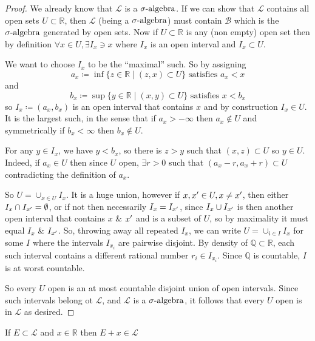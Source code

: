\begin{proof}
    We already know that $\mathcal{L}$ is a $\sigma\text{-algebra}$.
    If we can show that $\mathcal{L}$ contains all open sets $U \subset \mathbb{R}$, then $\mathcal{L}$ (being a $\sigma\text{-algebra}$) must contain $\mathcal{B}$ which is the $\sigma\text{-algebra}$ generated by open sets.
    Now if $U \subset \mathbb{R}$ is any (non empty) open set then by definition $\forall x \in U, \exists I_x \ni x $ where $I_x$ is an open interval and $I_x \subset U$.

    We want to choose $I_x$ to be the ``maximal'' such.
    So by assigning
    \[
        a_x \coloneqq \inf \{z \in \mathbb{R} \mid (z,x) \subset U \} \text{ satisfies } a_x < x
    \]
    and
    \[
        b_x \coloneqq \sup \{y \in \mathbb{R} \mid (x,y) \subset U \} \text{ satisfies } x < b_x
    \]
    so $I_x \coloneqq (a_x,b_x)$ is an open interval that contains $x$ and by construction $I_x \in U$.
    It is the largest such, in the sense that if $a_x > - \infty$ then $a_x \notin U$ and symmetrically if $b_x < \infty$ then $b_x \notin U$.

    For any $y \in I_x$, we have $y<b_x$, so there is $z > y$ such that $(x,z) \subset U$ so $y \in U$.
    Indeed, if $a_x \in U$ then since $U$ open, $\exists r > 0$ such that $(a_x - r, a_x +r) \subset U$ contradicting the definition of $a_x$.

    So $U = \cup_{x \in U} I_x$.
    It is a huge union, however if $x, x^{\prime} \in U, x \neq x^{\prime}$, then either $I_x \cap I_{x^{\prime}} = \emptyset$, or if not then necessarily $I_x = I_{x^{\prime}}$, since $I_x \cup I_{x^{\prime}}$ is then another open interval that contains $x$ \& $x^{\prime}$ and is a subset of $U$, so by maximality it must equal $I_x$ \& $I_{x^{\prime}}$.
    So, throwing away all repeated $I_x$, we can write $U = \cup_{i \in I} I_x$ for some $I$ where the intervals $I_{x_i}$ are pairwise disjoint.
    By density of $\mathbb{Q} \subset \mathbb{R}$, each such interval contains a different rational number $r_i \in I_{x_i}$.
    Since $\mathbb{Q}$ is countable, $I$ is at worst countable.

    So every $U$ open is an at most countable disjoint union of open intervals.
    Since such intervals belong ot $\mathcal{L}$, and $\mathcal{L}$ is a $\sigma\text{-algebra}$, it follows that every $U$ open is in $\mathcal{L}$ as desired.
\end{proof}

\begin{prop}
    If $E \subset \mathcal{L}$ and $x \in \mathbb{R}$ then $E + x \in \mathcal{L}$
\end{prop}

